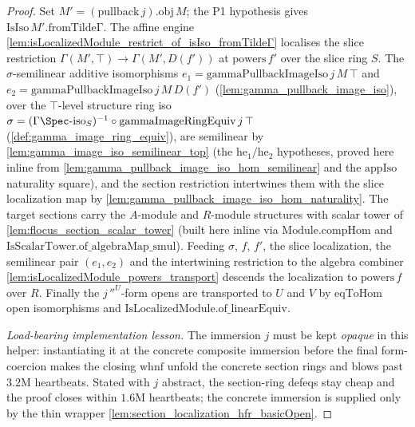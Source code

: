 \begin{proof}
  Set \(M' = (\mathrm{pullback}\,j).\mathrm{obj}\,M\); the P1 hypothesis gives
  \(\mathrm{IsIso}\,M'.\mathrm{fromTildeΓ}\). The affine engine
  \cref{lem:isLocalizedModule_restrict_of_isIso_fromTildeΓ} localises the slice restriction
  \(\Gamma(M', \top) \to \Gamma(M', D(f'))\) at \(\mathrm{powers}\,f'\) over the slice ring \(S\). The
  \(\sigma\)-semilinear additive isomorphisms
  \(e_1 = \mathrm{gammaPullbackImageIso}\,j\,M\,\top\) and
  \(e_2 = \mathrm{gammaPullbackImageIso}\,j\,M\,D(f')\) (\cref{lem:gamma_pullback_image_iso}), over the
  \(\top\)-level structure ring iso
  \(\sigma = (\Gamma\Spec\text{-iso}_S)^{-1} \circ \mathrm{gammaImageRingEquiv}\,j\,\top\)
  (\cref{def:gamma_image_ring_equiv}), are semilinear by
  \cref{lem:gamma_image_iso_semilinear_top} (the \(\mathrm{he}_1/\mathrm{he}_2\) hypotheses, proved here
  inline from \cref{lem:gamma_pullback_image_iso_hom_semilinear} and the \(\mathrm{appIso}\) naturality
  square), and the section restriction intertwines them with the slice localization map by
  \cref{lem:gamma_pullback_image_iso_hom_naturality}. The target sections carry the \(A\)-module and
  \(R\)-module structures with scalar tower of \cref{lem:flocus_section_scalar_tower} (built here inline
  via \(\mathrm{Module.compHom}\) and \(\mathrm{IsScalarTower.of\_algebraMap\_smul}\)). Feeding
  \(\sigma\), \(f\), \(f'\), the slice localization, the semilinear pair \((e_1, e_2)\) and the
  intertwining restriction to the algebra combiner \cref{lem:isLocalizedModule_powers_transport}
  descends the localization to \(\mathrm{powers}\,f\) over \(R\). Finally the \(j\,''^{U}\)-form opens
  are transported to \(U\) and \(V\) by \(\mathrm{eqToHom}\) open isomorphisms and
  \(\mathrm{IsLocalizedModule.of\_linearEquiv}\).

  \emph{Load-bearing implementation lesson.} The immersion \(j\) must be kept \emph{opaque} in this
  helper: instantiating it at the concrete composite immersion before the final form-coercion makes the
  closing \(\mathrm{whnf}\) unfold the concrete section rings and blows past \(3.2\)M heartbeats. Stated
  with \(j\) abstract, the section-ring defeqs stay cheap and the proof closes within
  \(1.6\)M heartbeats; the concrete immersion is supplied only by the thin wrapper
  \cref{lem:section_localization_hfr_basicOpen}.
\end{proof}

